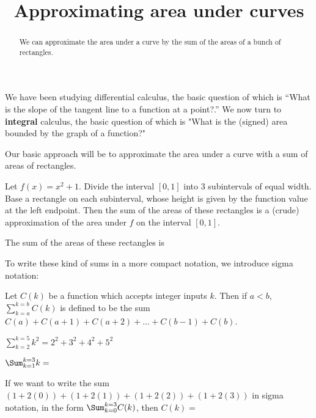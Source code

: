 \documentclass{ximera}
\title{Approximating area under curves}
\begin{document}
\begin{abstract}
	We can approximate the area under a curve by the sum of the areas of a bunch of rectangles.	
\end{abstract}

\maketitle

We have been studying differential calculus, the basic question of
which is ``What is the slope of the tangent line to a function at a
point?.''  We now turn to \textbf{integral} calculus, the basic
question of which is "What is the (signed) area bounded by the graph
of a function?"

Our basic approach will be to approximate the area under a curve with
a sum of areas of rectangles.


\begin{question}
  Let $f(x) = x^2+1$.  Divide the interval $[0,1]$ into $3$
  subintervals of equal width.  Base a rectangle on each subinterval,
  whose height is given by the function value at the left endpoint.
  Then the sum of the areas of these rectangles is a (crude)
  approximation of the area under $f$ on the interval $[0,1]$.

	
  The sum of the areas of these rectangles is 
\end{question}

To write these kind of sums in a more compact notation, we introduce
sigma notation:

\begin{definition}
  Let $C(k)$ be a function which accepts integer inputs $k$.  Then if
  $a < b$, $\sum_{k=a}^{k=b} C(k)$ is defined to be the sum
  $C(a)+C(a+1)+C(a+2)+\dots +C(b-1)+C(b)$.
\end{definition}

\begin{example}
  $\sum_{k=2}^{k=5} k^2 = 2^2+3^2+4^2+5^2$
\end{example}

\begin{question}
	$\Sum_{k=1}^{k=3} k = $
\end{question}

\begin{question}
  If we want to write the sum $(1+2(0))+(1+2(1))+(1+2(2))+(1+2(3))$ in
  sigma notation, in the form $\Sum_{k=0}^{k=3} C(k)$, then
  $C(k)=$
\end{question}
\end{document}
